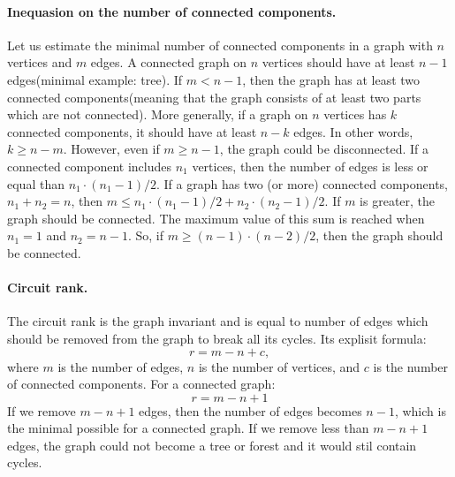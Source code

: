 \documentclass{article}
\begin{document}
\paragraph{Inequasion on the number of connected components.}
Let us estimate the minimal number of connected components in a graph with $n$ vertices and $m$ edges. A connected graph on $n$ vertices should have at least $n-1$ edges(minimal example: tree). If $m < n-1$, then the graph has at least two connected components(meaning that the graph consists of at least two parts which are not connected). More generally, if a graph on $n$ vertices has $k$ connected components, it should have at least $n-k$ edges. In other words, $k \geq n-m$. However, even if $m \geq n-1$, the graph could be disconnected. If a connected component includes $n_1$ vertices, then the number of edges is less or equal than $n_1 \cdot (n_1 - 1)/2$. If a graph has two (or more) connected components, $n_1 + n_2=n$, then $m \leq n_1 \cdot (n_1 - 1)/2 + n_2 \cdot (n_2 - 1)/2$. If $m$ is greater, the graph should be connected. The maximum value of this sum is reached when $n_1 =1$ and $n_2=n-1$. So, if $m \geq (n-1) \cdot (n-2)/2$, then the graph should be connected.

\paragraph{Circuit rank.}
The circuit rank is the graph invariant and is equal to number of edges which should be removed from the graph to break all its cycles. Its explisit formula:
\[
r=m-n+c,
\]
where $m$ is the number of edges, $n$ is the number of vertices, and $c$ is the number of connected components. For a connected graph:
\[
r=m-n+1
\]
If we remove $m-n+1$ edges, then the number of edges becomes $n-1$, which is the minimal possible for a connected graph. If we remove less than $m-n+1$ edges, the graph could not become a tree or forest and it would stil contain cycles.
\end{document}
